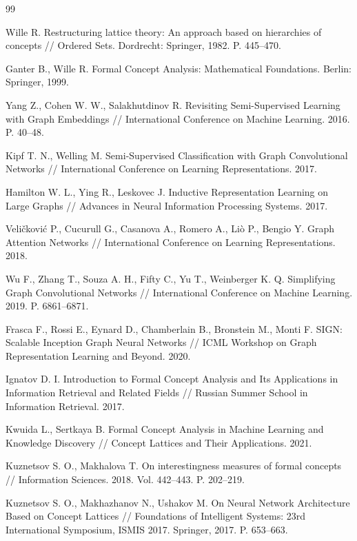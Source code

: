 \documentclass[14pt,a4paper]{extarticle}
\begin{document}
\begin{thebibliography}{99}

Wille R. Restructuring lattice theory: An approach based on hierarchies of concepts //
Ordered Sets. Dordrecht: Springer, 1982. P. 445--470.

Ganter B., Wille R. Formal Concept Analysis: Mathematical Foundations.
Berlin: Springer, 1999.

Yang Z., Cohen W. W., Salakhutdinov R.
Revisiting Semi-Supervised Learning with Graph Embeddings //
International Conference on Machine Learning. 2016. P. 40--48.

Kipf T. N., Welling M.
Semi-Supervised Classification with Graph Convolutional Networks //
International Conference on Learning Representations. 2017.

Hamilton W. L., Ying R., Leskovec J.
Inductive Representation Learning on Large Graphs //
Advances in Neural Information Processing Systems. 2017.

Veličković P., Cucurull G., Casanova A., Romero A., Liò P., Bengio Y.
Graph Attention Networks //
International Conference on Learning Representations. 2018.

Wu F., Zhang T., Souza A. H., Fifty C., Yu T., Weinberger K. Q.
Simplifying Graph Convolutional Networks //
International Conference on Machine Learning. 2019. P. 6861--6871.

Frasca F., Rossi E., Eynard D., Chamberlain B., Bronstein M., Monti F.
SIGN: Scalable Inception Graph Neural Networks //
ICML Workshop on Graph Representation Learning and Beyond. 2020.

Ignatov D. I.
Introduction to Formal Concept Analysis and Its Applications in Information Retrieval and Related Fields //
Russian Summer School in Information Retrieval. 2017.

Kwuida L., Sertkaya B.
Formal Concept Analysis in Machine Learning and Knowledge Discovery //
Concept Lattices and Their Applications. 2021.

Kuznetsov S. O., Makhalova T.
On interestingness measures of formal concepts //
Information Sciences. 2018. Vol. 442--443. P. 202--219.

Kuznetsov S. O., Makhazhanov N., Ushakov M.
On Neural Network Architecture Based on Concept Lattices //
Foundations of Intelligent Systems: 23rd International Symposium, ISMIS 2017.
Springer, 2017. P. 653--663.


\end{thebibliography}
\end{document}
